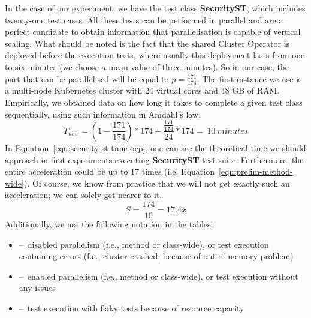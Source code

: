 In the case of our experiment, we have the test class \textbf {SecurityST}, which includes twenty-one test cases.
All these tests can be performed in parallel and are a perfect candidate to obtain information that parallelisation is capable of vertical scaling.
What should be noted is the fact that the shared Cluster Operator is deployed before the execution tests, where usually this deployment lasts from one to six minutes (we choose a mean value of three minutes).
So in our case, the part that can be parallelised will be equal to $p = \frac{171}{174}$.
The first instance we use is a multi-node Kubernetes cluster with 24 virtual cores and 48 GB of RAM.
Empirically, we obtained data on how long it takes to complete a given test class sequentially, using such information in Amdahl's law.
\begin{equation}
    \label{eqn:security-st-time-ocp}
    T_{new} = (1 - \frac{171}{174}) * 174 +  \frac{\frac{171}{174}}{24} * 174 =~10~minutes
    \tag{6}
\end{equation}
In Equation~\eqref{eqn:security-st-time-ocp}, one can see the theoretical time we should approach in first experiments executing \textbf{SecurityST} test suite.
Furthermore, the entire acceleration could be up to 17 times (i.e, Equation~\eqref{eqn:prelim-method-wide}).
Of course, we know from practice that we will not get exactly such an acceleration;
we can solely get nearer to it.
\begin{equation}
    \label{eqn:prelim-method-wide}
    S = \frac{174}{10} =17.4x
    \tag{7}
\end{equation}
Additionally, we use the following notation in the tables:
\begin{itemize}[itemsep=1mm, parsep=0pt]
    \item {\xmark} \---\ disabled parallelism (f.e., method or class-wide), or test execution containing errors (f.e., cluster crashed, because of out of memory problem)
    \item {\cmark} \---\ enabled parallelism (f.e., method or class-wide), or test execution without any issues
    \item {\selectfont{}\relax} \---\ test execution with flaky tests because of resource capacity
\end{itemize}

